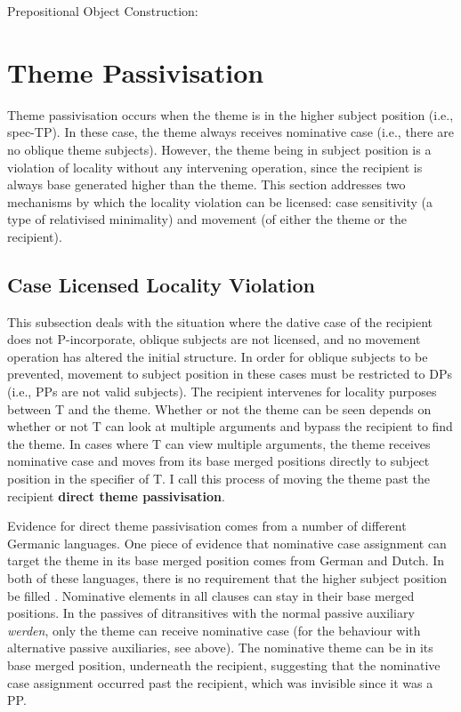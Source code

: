 \begin{exe}
	 Prepositional Object Construction: \\
\end{exe}


\section{Theme Passivisation}
Theme passivisation occurs when the theme is in the higher subject position (i.e., spec-TP). In these case, the theme always receives nominative case (i.e., there are no oblique theme subjects). However, the theme being in subject position is a violation of locality without any intervening operation, since the recipient is always base generated higher than the theme. This section addresses two mechanisms by which the locality violation can be licensed: case sensitivity (a type of relativised minimality) and movement (of either the theme or the recipient).

\subsection{Case Licensed Locality Violation}
This subsection deals with the situation where the dative case of the recipient does not P-incorporate, oblique subjects are not licensed, and no movement operation has altered the initial structure. In order for oblique subjects to be prevented, movement to subject position in these cases must be restricted to DPs (i.e., PPs are not valid subjects). The recipient intervenes for locality purposes between T and the theme. Whether or not the theme can be seen depends on whether or not T can look at multiple arguments and bypass the recipient to find the theme. In cases where T can view multiple arguments, the theme receives nominative case and moves from its base merged positions directly to subject position in the specifier of T. I call this process of moving the theme past the recipient \textbf{direct theme passivisation}.

Evidence for direct theme passivisation comes from a number of different Germanic languages. One piece of evidence that nominative case assignment can target the theme in its base merged position comes from German and Dutch. In both of these languages, there is no requirement that the higher subject position be filled \citep{Besten.1990}. Nominative elements in all clauses can stay in their base merged positions. In the passives of ditransitives with the normal passive auxiliary \textit{werden}, only the theme can receive nominative case (for the behaviour with alternative passive auxiliaries, see above). The nominative theme can be in its base merged position, underneath the recipient, suggesting that the nominative case assignment occurred past the recipient, which was invisible since it was a PP.

